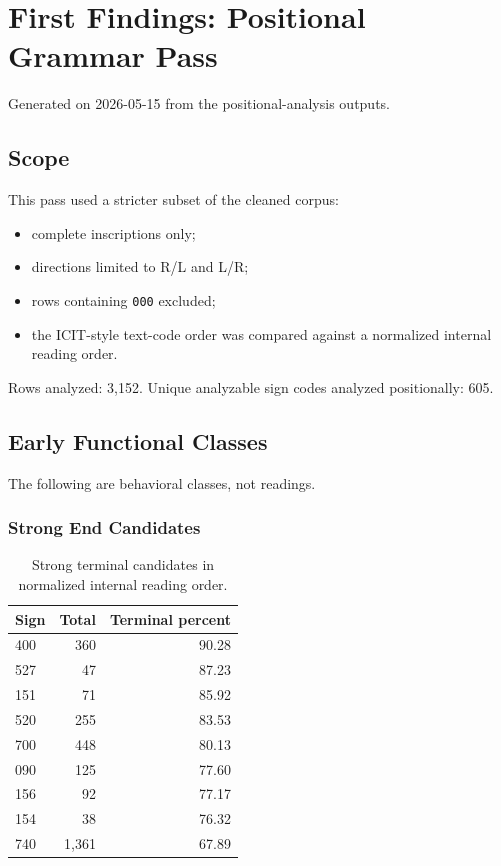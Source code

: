 \section{First Findings: Positional Grammar Pass}

Generated on 2026-05-15 from the positional-analysis outputs.

\subsection{Scope}

This pass used a stricter subset of the cleaned corpus:

\begin{itemize}
  \item complete inscriptions only;
  \item directions limited to R/L and L/R;
  \item rows containing \texttt{000} excluded;
  \item the ICIT-style text-code order was compared against a normalized internal reading order.
\end{itemize}

Rows analyzed: 3,152. Unique analyzable sign codes analyzed positionally: 605.

\subsection{Early Functional Classes}

The following are behavioral classes, not readings.

\subsubsection{Strong End Candidates}

\begin{table}[htbp]
\centering
\begin{tabular}{lrr}
\toprule
\textbf{Sign} & \textbf{Total} & \textbf{Terminal percent} \\
\midrule
400 & 360 & 90.28 \\
527 & 47 & 87.23 \\
151 & 71 & 85.92 \\
520 & 255 & 83.53 \\
700 & 448 & 80.13 \\
090 & 125 & 77.60 \\
156 & 92 & 77.17 \\
154 & 38 & 76.32 \\
740 & 1,361 & 67.89 \\
\bottomrule
\end{tabular}
\caption{Strong terminal candidates in normalized internal reading order.}
\label{tab:terminal-candidates}
\end{table}

